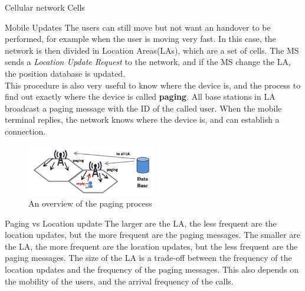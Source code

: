 \begin{section}{Cellular network Cells}
  \begin{subsection}{Mobile Updates}
    The users can still move but not want an handover to be performed, for example when the user is
    moving very fast. In this case, the network is then divided in Location Areas(LAs), which are
    a set of cells. The MS sends a \textit{Location Update Request} to the network, and if the MS 
    change the LA, the position database is updated.\\ 
    This procedure is also very useful to know where the device is, and the process to find out
    exactly where the device is called \textbf{paging}. All base stations in LA broadcast a paging 
    message with the ID of the called user. When the mobile terminal replies, the network knows
    where the device is, and can establish a connection.
    \begin{figure}[h]
      \centering
      \includegraphics[width=0.5\textwidth]{img/wireless/mobile paging.png}
      \caption{An overview of the paging process}
      \label{fig:paging}
    \end{figure}
    \begin{subsubsection}{Paging vs Location update}
      The larger are the LA, the less frequent are the location updates, but the more frequent are 
      the paging messages. The smaller are the LA, the more frequent are the location updates, but
      the less frequent are the paging messages. The size of the LA is a trade-off between the
      frequency of the location updates and the frequency of the paging messages.
      This also depends on the mobility of the users, and the arrival frequency of the calls.
    \end{subsubsection}
  \end{subsection}
\end{section}

